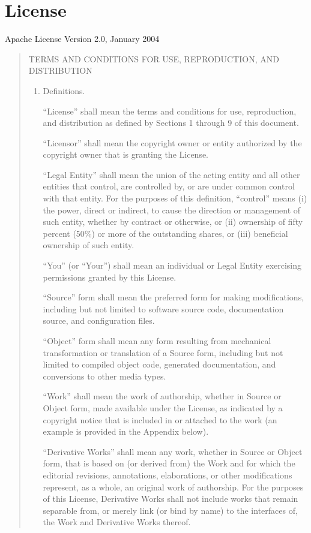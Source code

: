 \documentclass[letterpaper,10pt,english]{sphinxmanual}
\begin{document}
\chapter{License}
\label{\detokenize{license:license}}\label{\detokenize{license::doc}}
Apache License
Version 2.0, January 2004
\begin{quote}

TERMS AND CONDITIONS FOR USE, REPRODUCTION, AND DISTRIBUTION
\begin{enumerate}
\def\theenumi{\arabic{enumi}}
\def\labelenumi{\theenumi .}
\makeatletter\def\p@enumii{\p@enumi \theenumi .}\makeatother
\item {} 
Definitions.

“License” shall mean the terms and conditions for use, reproduction,
and distribution as defined by Sections 1 through 9 of this document.

“Licensor” shall mean the copyright owner or entity authorized by
the copyright owner that is granting the License.

“Legal Entity” shall mean the union of the acting entity and all
other entities that control, are controlled by, or are under common
control with that entity. For the purposes of this definition,
“control” means (i) the power, direct or indirect, to cause the
direction or management of such entity, whether by contract or
otherwise, or (ii) ownership of fifty percent (50\%) or more of the
outstanding shares, or (iii) beneficial ownership of such entity.

“You” (or “Your”) shall mean an individual or Legal Entity
exercising permissions granted by this License.

“Source” form shall mean the preferred form for making modifications,
including but not limited to software source code, documentation
source, and configuration files.

“Object” form shall mean any form resulting from mechanical
transformation or translation of a Source form, including but
not limited to compiled object code, generated documentation,
and conversions to other media types.

“Work” shall mean the work of authorship, whether in Source or
Object form, made available under the License, as indicated by a
copyright notice that is included in or attached to the work
(an example is provided in the Appendix below).

“Derivative Works” shall mean any work, whether in Source or Object
form, that is based on (or derived from) the Work and for which the
editorial revisions, annotations, elaborations, or other modifications
represent, as a whole, an original work of authorship. For the purposes
of this License, Derivative Works shall not include works that remain
separable from, or merely link (or bind by name) to the interfaces of,
the Work and Derivative Works thereof.


\end{enumerate}
\end{quote}
\end{document}
